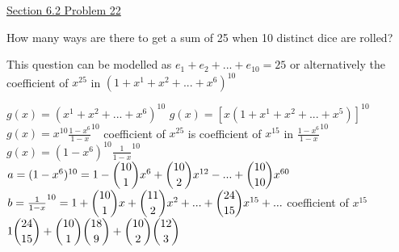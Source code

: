 \documentclass{article}
\begin{document}
\underline{Section 6.2 Problem 22}

How many ways are there to get a sum of 25 when 10 distinct dice are rolled?\newline{}

This question can be modelled as $e_1+e_2+...+e_{10}=25$ or alternatively the coefficient of $x^{25}$ in $(1+x^1+x^2+...+x^6)^{10}$\newline{}

$g(x)=(x^1+x^2+...+x^6)^{10}$\newline{}
$g(x)=[x(1+x^1+x^2+...+x^5)]^{10}$\newline{}
$g(x)=x^{10}\frac{1-x^{6}}{1-x}^{10}$\newline{}
coefficient of $x^{25}$ is coefficient of $x^{15}$ in $\frac{1-x^{6}}{1-x}^{10}$\newline{}
$g(x)=(1-x^{6})^{10}\frac{1}{1-x}^{10}$\newline{}
$a=(1-x^{6})^{10}=1-\dbinom{10}{1}x^6+\dbinom{10}{2}x^{12}-...+\dbinom{10}{10}x^{60}$\newline{}
$b=\frac{1}{1-x}^{10}=1+\dbinom{10}{1}x+\dbinom{11}{2}x^2+...+\dbinom{24}{15}x^{15}+...$\newline{}
coefficient of $x^{15}$\newline{}
$1\dbinom{24}{15}+\dbinom{10}{1}\dbinom{18}{9}+\dbinom{10}{2}\dbinom{12}{3}$\newline{} 
\end{document}
